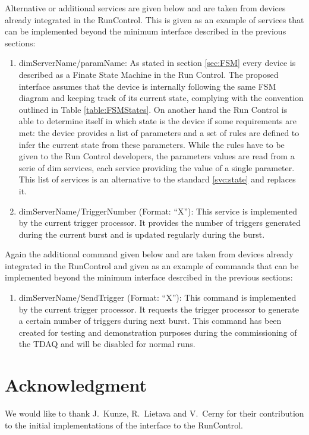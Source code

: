 \documentclass[a4paper]{article}
\begin{document}
Alternative or additional services are given below and are taken from devices
already integrated in the RunControl. This is given as an example of services
that can be implemented beyond the minimum interface described in the previous
sections:
\begin{enumerate}[label=\textbf{ASVC.\arabic*}]
	\item \label{svc:stateParams} dimServerName/paramName: As stated in section
	\ref{sec:FSM} every device is described as a Finate State Machine in
	the Run Control. The proposed interface assumes that the device is internally
	following the same FSM diagram and keeping track of its current state,
	complying with the convention outlined in Table \ref{table:FSMStates}. On
	another hand the Run Control is able to determine itself in which state is the
	device if some requirements are met: the device provides a list of parameters
	and a set of rules are defined to infer the current state from these
	parameters.
	While the rules have to be given to the Run Control developers, the
	parameters values are read from a serie of dim services, each service
	providing the value of a single parameter. This list of services is an
	alternative to the standard \ref{svc:state} and replaces it.
	\item dimServerName/TriggerNumber (Format: ``X''): This service is
	implemented by the current trigger processor. It provides the number of
	triggers generated during the current burst and is updated regularly during
	the burst.
\end{enumerate}

Again the additional command given below and are taken from devices already
integrated in the RunControl and given as an example of commands that can be
implemented beyond the minimum interface desrcibed in the previous sections:
\begin{enumerate}[label=\textbf{ACMD.\arabic*}]
	\item dimServerName/SendTrigger (Format: ``X''): This command is
	implemented by the current trigger processor. It requests the trigger processor
	to generate a certain number of triggers during next burst. This command has
	been created for testing and demonstration purposes during the commissioning of
	the TDAQ and will be disabled for normal runs.
\end{enumerate}

\section{Acknowledgment}
We would like to thank J.~Kunze, R.~Lietava and V.~Cerny for their contribution to the initial
implementations of the interface to the RunControl.

\thebibliography{}

\end{document}
